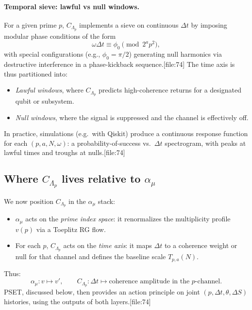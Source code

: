 \documentclass[11pt]{article}
\begin{document}
\paragraph{Temporal sieve: lawful vs null windows.}
For a given prime $p$, $C_{\Lambda_p}$ implements a sieve on continuous $\Delta t$ by imposing modular phase conditions of the form
\begin{equation}
    \omega \Delta t \equiv \phi_0 \pmod{2^a p^2},
\end{equation}
with special configurations (e.g., $\phi_0 = \pi/2$) generating null harmonics via destructive interference in a phase-kickback sequence.[file:74]
The time axis is thus partitioned into:
\begin{itemize}
    \item \emph{Lawful windows}, where $C_{\Lambda_p}$ predicts high-coherence returns for a designated qubit or subsystem.
    \item \emph{Null windows}, where the signal is suppressed and the channel is effectively off.
\end{itemize}

In practice, simulations (e.g.\ with Qiskit) produce a continuous response function for each $(p,a,N,\omega)$: a probability-of-success vs.\ $\Delta t$ spectrogram, with peaks at lawful times and troughs at nulls.[file:74]

\subsection{Where $C_{\Lambda_p}$ lives relative to $\alpha_\mu$}

We now position $C_{\Lambda_p}$ in the $\alpha_\mu$ stack:
\begin{itemize}
    \item $\alpha_\mu$ acts on the \emph{prime index space}: it renormalizes the multiplicity profile $v(p)$ via a Toeplitz RG flow.
    \item For each $p$, $C_{\Lambda_p}$ acts on the \emph{time axis}: it maps $\Delta t$ to a coherence weight or null for that channel and defines the baseline scale $T_{p,a}(N)$.
\end{itemize}

Thus:
\begin{equation}
    \alpha_\mu : v \mapsto v', \qquad 
    C_{\Lambda_p} : \Delta t \mapsto \text{coherence amplitude in the $p$-channel}.
\end{equation}
PSET, discussed below, then provides an action principle on joint $(p,\Delta t,\theta,\Delta S)$ histories, using the outputs of both layers.[file:74]
\end{document}
